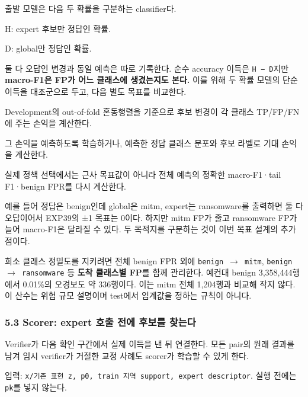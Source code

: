 출발 모델은 다음 두 확률을 구분하는 classifier다.

\par\noindent \textbullet\enspace H: expert 후보만 정답인 확률.


\par\noindent \textbullet\enspace D: global만 정답인 확률.


둘 다 오답인 변경과 동일 예측은 따로 기록한다. 순수 accuracy 이득은 \texttt{H − D}지만 \textbf{macro-F1은 FP가 어느 클래스에 생겼는지도 본다.} 이를 위해 두 확률 모델의 단순 이득을 대조군으로 두고, 다음 별도 목표를 비교한다.

\par\noindent \textbullet\enspace Development의 out-of-fold 혼동행렬을 기준으로 후보 변경이 각 클래스 TP/\allowbreak{}FP/\allowbreak{}FN에 주는 손익을 계산한다.


\par\noindent \textbullet\enspace 그 손익을 예측하도록 학습하거나, 예측한 정답 클래스 분포와 후보 라벨로 기대 손익을 계산한다.


\par\noindent \textbullet\enspace 실제 정책 선택에서는 근사 목표값이 아니라 전체 예측의 정확한 macro-F1·tail F1·benign FPR를 다시 계산한다.


예를 들어 정답은 benign인데 global은 mitm, expert는 ransomware를 출력하면 둘 다 오답이어서 EXP39의 ±1 목표는 0이다. 하지만 mitm FP가 줄고 ransomware FP가 늘어 macro-F1은 달라질 수 있다. 두 목적지를 구분하는 것이 이번 목표 설계의 추가점이다.

희소 클래스 정밀도를 지키려면 전체 benign FPR 외에 \texttt{benign  \ensuremath{\rightarrow} \allowbreak{} mitm}, \texttt{benign  \ensuremath{\rightarrow} \allowbreak{} ransomw\allowbreak{}are} 등 \textbf{도착 클래스별 FP}를 함께 관리한다. 예컨대 benign 3,358,444행에서 0.01\%의 오경보도 약 336행이다. 이는 mitm 전체 1,204행과 비교해 작지 않다. 이 산수는 위험 규모 설명이며 test에서 임계값을 정하는 규칙이 아니다.

\subsubsection{5.3 Scorer: expert 호출 전에 후보를 찾는다}
Verifier가 다음 확인 구간에서 실제 이득을 낸 뒤 연결한다. 모든 pair의 원래 결과를 남겨 임시 verifier가 거절한 교정 사례도 scorer가 학습할 수 있게 한다.

\par\noindent \textbullet\enspace 입력: \texttt{x/\allowbreak{}\allowbreak{}기존 표현 \allowbreak{}z,\allowbreak{} p0,\allowbreak{} t\allowbreak{}rain 지역 \allowbreak{}support,\allowbreak{} expert \allowbreak{}descript\allowbreak{}or}. 실행 전에는 \texttt{pk}를 넣지 않는다.


